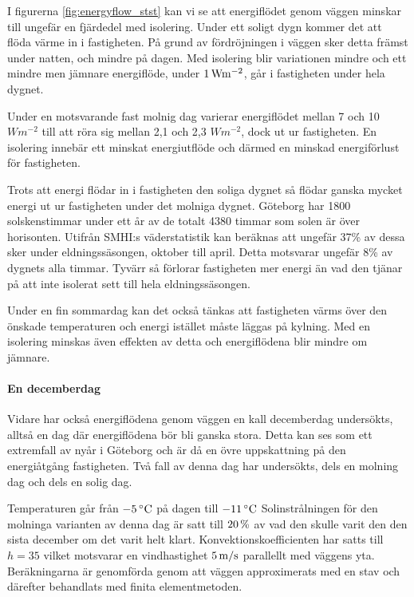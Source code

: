 I figurerna \ref{fig:energyflow_stst} kan vi se att energiflödet genom väggen minskar till 
ungefär en fjärdedel med isolering. Under ett soligt dygn kommer det att flöda värme in i
 fastigheten. På grund av fördröjningen i väggen sker detta främst under natten, 
 och mindre på dagen. Med isolering blir variationen mindre och ett mindre men jämnare 
 energiflöde, under $\unit[1]{W m^{-2}}$, går i fastigheten under hela dygnet.

Under en motsvarande fast molnig dag varierar energiflödet mellan 7 och 10 
$\unit{W m^{-2}}$ till att röra sig mellan 2,1 och 2,3 $\unit{W m^{-2}}$, dock ut ur 
fastigheten. En isolering innebär ett minskat energiutflöde och därmed en minskad 
energiförlust för fastigheten.

Trots att energi flödar in i fastigheten den soliga dygnet så flödar ganska mycket energi 
ut ur fastigheten under det molniga dygnet. Göteborg har 1800 solskenstimmar under ett
 år av de totalt 4380 timmar som solen är över horisonten. Utifrån SMHI:s väderstatistik \cite{SMHIdata}
 kan beräknas att ungefär 37\% av dessa sker under eldningssäsongen, oktober till april. 
 Detta motsvarar ungefär 8\% av dygnets alla timmar. Tyvärr så förlorar fastigheten mer 
 energi än vad den tjänar på att inte isolerat sett till hela eldningssäsongen.

Under en fin sommardag kan det också tänkas att fastigheten värms över den önskade 
temperaturen och energi istället måste läggas på kylning. Med en isolering minskas även 
effekten av detta och energiflödena blir mindre om jämnare.

\paragraph{En decemberdag}

Vidare har också energiflödena genom väggen en kall decemberdag undersökts, 
alltså en dag där energiflödena bör bli ganska stora. Detta kan ses som ett extremfall av
nyår i Göteborg och är då en övre uppskattning på den energiåtgång fastigheten. Två fall av
denna dag har undersökts, dels en molning dag och dels en solig dag.

 Temperaturen går från $\unit[-5]{^\circ C}$ på dagen till $\unit[-11]{^\circ C}$ 
 Solinstrålningen för den molninga varianten av denna dag är satt till $\unit[20]{\%}$
 av vad den skulle varit den den 
 sista december om det varit helt klart. Konvektionskoefficienten har satts till $h=35$ 
 vilket motsvarar en vindhastighet $\unit[5]{m/s}$ parallellt med väggens yta. 
 Beräkningarna är genomförda genom att väggen approximerats med en stav och 
 därefter behandlats med finita elementmetoden.


